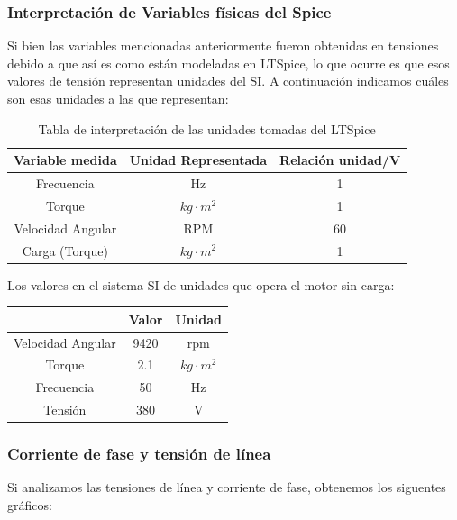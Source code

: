\documentclass[e4_tp3_main.tex]{subfiles}
\begin{document}
\subsubsection{Interpretación de Variables físicas del Spice}
Si bien las variables mencionadas anteriormente fueron obtenidas en tensiones debido a que así es como están modeladas en LTSpice, lo que ocurre es que esos valores de tensión representan unidades del SI. A continuación indicamos cuáles son esas unidades a las que representan:

\begin{table}[H]
\centering
\begin{tabular}{@{}ccc@{}}

Variable medida   & Unidad Representada     & Relación unidad/V \\ \midrule
Frecuencia        & Hz                      & 1                 \\
Torque            & $kg \cdot m^2$ & 1                 \\
Velocidad Angular & RPM                     & 60                \\
Carga (Torque)    & $kg \cdot m^2$ & 1                 \\ \bottomrule
\end{tabular}
\caption{Tabla de interpretación de las unidades tomadas del LTSpice}
\end{table}

Los valores en el sistema SI de unidades que opera el motor sin carga:

\begin{table}[h]
\centering
\begin{tabular}{clll|c|c|}
\cline{5-6}
\multicolumn{4}{c|}{}                    & Valor & Unidad \\ \hline
\multicolumn{4}{|c|}{Velocidad Angular} & 9420  & rpm    \\ \hline
\multicolumn{4}{|c|}{Torque}            & 2.1   & $kg \cdot m^2$    \\ \hline
\multicolumn{4}{|c|}{Frecuencia}        & 50    & Hz     \\ \hline
\multicolumn{4}{|c|}{Tensi\'on}           & 380   & V      \\ \hline
\end{tabular}
\end{table}


\subsubsection{Corriente de fase y tensi\'on de l\'inea}
Si analizamos las tensiones de línea y corriente de fase, obtenemos los siguentes gráficos:
\end{document}
